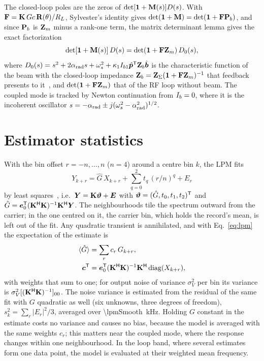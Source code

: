 The closed-loop poles are the zeros of $\det[\mathbf{1}+\mathbf{M}(s)]D(s)$. With $\mathbf{F}=\mathbf{K}\,Gc\,\mathbf{R}(\theta)/R_L$, Sylvester's identity gives $\det(\mathbf{1}+\mathbf{M})=\det(\mathbf{1}+\mathbf{F}\mathbf{P}_b)$, and since $\mathbf{P}_b$ is $\mathbf{Z}_m$ minus a rank-one term, the matrix determinant lemma gives the exact factorization
\begin{equation}
\det[\mathbf{1}+\mathbf{M}(s)]\,D(s)=\det(\mathbf{1}+\mathbf{F}\mathbf{Z}_m)\,D_0(s),
\end{equation}
where $D_0(s)=s^2+2\alpha_\mathrm{rad} s+\omega_s^2+\kappa_1I_{b1}\hat{\bm{p}}^\mathsf{T}\mathbf{Z}_b\hat{\bm{b}}$ is the characteristic function of the beam with the closed-loop impedance $\mathbf{Z}_b=\mathbf{Z}_\Sigma(\mathbf{1}+\mathbf{F}\mathbf{Z}_m)^{-1}$ that feedback presents to it~\cite{Boussard1985,Wilson1993}, and $\det(\mathbf{1}+\mathbf{F}\mathbf{Z}_m)$ that of the RF loop without beam. The coupled mode is tracked by Newton continuation from $I_b=0$, where it is the incoherent oscillator $s=-\alpha_\mathrm{rad}\pm j(\omega_s^2-\alpha_\mathrm{rad}^2)^{1/2}$.

\section{Estimator statistics}\label{app:estimator}

With the bin offset $r=-n,\dots,n$ ($n=4$) around a centre bin $k$, the LPM fits
\begin{equation}
Y_{k+r}=\hat G\,X_{k+r}+\sum_{q=0}^{2}t_q\,(r/n)^q+E_r
\end{equation}
by least squares~\cite{Pintelon2010}, i.e.\ $\bm{Y}=\mathbf{K}\bm{\vartheta}+\bm{E}$ with $\bm{\vartheta}=(\hat G,t_0,t_1,t_2)^\mathsf{T}$ and $\hat G=\bm{e}_0^\mathsf{T}(\mathbf{K}^\mathsf{H}\mathbf{K})^{-1}\mathbf{K}^\mathsf{H}\bm{Y}$. The neighbourhoods tile the spectrum outward from the carrier; in the one centred on it, the carrier bin, which holds the record's mean, is left out of the fit. Any quadratic transient is annihilated, and with Eq.~\eqref{eq:lpm} the expectation of the estimate is
\begin{align}
\langle\hat G\rangle&=\sum_r c_r\,G_{k+r},\\
\bm{c}^\mathsf{T}&=\bm{e}_0^\mathsf{T}(\mathbf{K}^\mathsf{H}\mathbf{K})^{-1}\mathbf{K}^\mathsf{H}\,\mathrm{diag}(X_{k+r}),
\end{align}
with weights that sum to one; for output noise of variance $\sigma_V^2$ per bin its variance is $\sigma_V^2[(\mathbf{K}^\mathsf{H}\mathbf{K})^{-1}]_{00}$. The noise variance is estimated from the residual of the same fit with $G$ quadratic as well (six unknowns, three degrees of freedom), $s_k^2=\sum_r|E_r|^2/3$, averaged over \SI{\lpmSmooth}{kHz}. Holding $G$ constant in the estimate costs no variance and causes no bias, because the model is averaged with the same weights $c_r$; this matters near the coupled mode, where the response changes within one neighbourhood. In the loop band, where several estimates form one data point, the model is evaluated at their weighted mean frequency.

